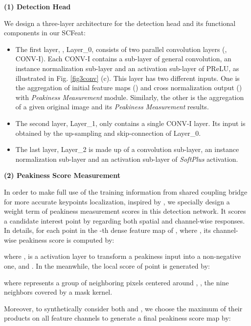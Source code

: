 \documentclass[journal]{IEEEtran}
\begin{document}
\textbf{(1) Detection Head}

We design a three-layer architecture for the detection head and its functional components in our SCFeat:
\begin{itemize}
\item{The first layer, , Layer\_0, consists of two parallel convolution layers (, CONV-I). 
Each CONV-I contains a sub-layer of general   convolution, an instance normalization sub-layer and an activation sub-layer of PReLU, as illustrated in Fig. \ref{fig3conv} (c).
This layer has two different inputs. One is the aggregation of initial feature maps () and cross normalization output () with \emph{Peakiness Measurement} module. Similarly, the other is the aggregation of a given original image and its \emph{Peakiness Measurement} results.
 }
 
\item{The second layer, Layer\_1, only contains a single CONV-I layer. Its input is obtained by the up-sampling and skip-connection of Layer\_0.
}
\item{The last layer, Layer\_2 is made up of a  convolution sub-layer, an instance normalization sub-layer and an activation sub-layer of \emph{SoftPlus} activation.
}
\end{itemize}
















\textbf{(2) Peakiness Score Measurement}

In order to make full use of the training information from shared coupling bridge for more accurate keypoints localization, inspired by \cite{D2net,aslfeat}, 
we specially design a weight term of peakiness measurement scores in this detection network. 
It scores a candidate interest point by regarding both spatial and channel-wise responses. In details, for each point  in the -th dense feature map  of , where , its channel-wise peakiness score is computed by:

where , 
 is a  activation layer to transform a peakiness input into a non-negative one, and . In the meanwhile, the local score of point  is generated by:

where  represents a group of neighboring pixels centered around , , the nine neighbors covered by a  mask kernel. 

Moreover, to synthetically consider both  and , we choose the maximum of their products on all feature channels to generate a final peakiness score map  by:
\end{document}
